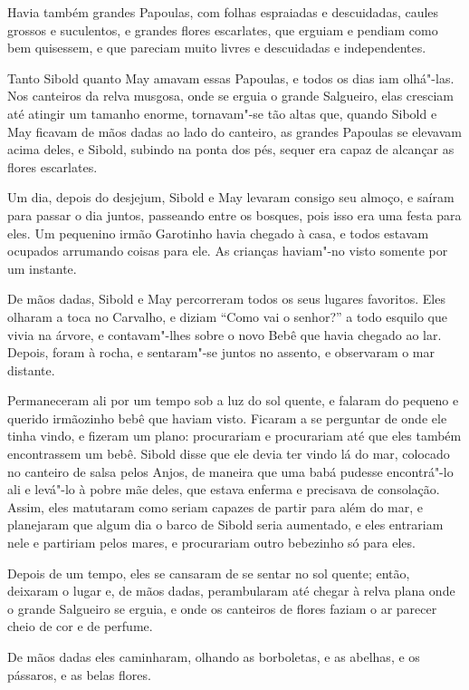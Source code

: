 Havia também grandes Papoulas, com folhas espraiadas e descuidadas,
caules grossos e suculentos, e grandes flores escarlates, que erguiam e
pendiam como bem quisessem, e que pareciam muito livres e descuidadas e
independentes.

Tanto Sibold quanto May amavam essas Papoulas, e todos os dias iam
olhá"-las. Nos canteiros da relva musgosa, onde se erguia o grande
Salgueiro, elas cresciam até atingir um tamanho enorme, tornavam"-se tão
altas que, quando Sibold e May ficavam de mãos dadas ao lado do
canteiro, as grandes Papoulas se elevavam acima deles, e Sibold, subindo
na ponta dos pés, sequer era capaz de alcançar as flores escarlates.

Um dia, depois do desjejum, Sibold e May levaram consigo seu almoço, e
saíram para passar o dia juntos, passeando entre os bosques, pois isso
era uma festa para eles. Um pequenino irmão Garotinho havia chegado à
casa, e todos estavam ocupados arrumando coisas para ele. As crianças
haviam"-no visto somente por um instante.

De mãos dadas, Sibold e May percorreram todos os seus lugares favoritos.
Eles olharam a toca no Carvalho, e diziam ``Como vai o senhor?'' a todo
esquilo que vivia na árvore, e contavam"-lhes sobre o novo Bebê que havia
chegado ao lar. Depois, foram à rocha, e sentaram"-se juntos no assento,
e observaram o mar distante.

Permaneceram ali por um tempo sob a luz do sol quente, e falaram do
pequeno e querido irmãozinho bebê que haviam visto. Ficaram a se
perguntar de onde ele tinha vindo, e fizeram um plano: procurariam e
procurariam até que eles também encontrassem um bebê. Sibold disse que
ele devia ter vindo lá do mar, colocado no canteiro de salsa pelos
Anjos, de maneira que uma babá pudesse encontrá"-lo ali e levá"-lo à pobre
mãe deles, que estava enferma e precisava de consolação. Assim, eles
matutaram como seriam capazes de partir para além do mar, e planejaram
que algum dia o barco de Sibold seria aumentado, e eles entrariam nele e
partiriam pelos mares, e procurariam outro bebezinho só para eles.

Depois de um tempo, eles se cansaram de se sentar no sol quente; então,
deixaram o lugar e, de mãos dadas, perambularam até chegar à relva plana
onde o grande Salgueiro se erguia, e onde os canteiros de flores faziam
o ar parecer cheio de cor e de perfume.

De mãos dadas eles caminharam, olhando as borboletas, e as abelhas, e os
pássaros, e as belas flores.

